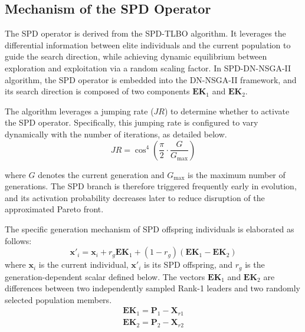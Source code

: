 \subsection{Mechanism of the SPD Operator}
The SPD operator is derived from the SPD-TLBO algorithm. It leverages the differential information between elite individuals and the current population to guide the search direction, while achieving dynamic equilibrium between exploration and exploitation via a random scaling factor. In SPD-DN-NSGA-II algorithm, the SPD operator is embedded into the DN-NSGA-II framework, and its search direction is composed of two components $\bm{EK}_1$ and $\bm{EK}_2$.
\par The algorithm leverages a jumping rate ($JR$) to determine whether to activate the SPD operator. Specifically, this jumping rate is configured to vary dynamically with the number of iterations, as detailed below. 
\begin{equation}
	JR=\cos^4 (\frac{\pi}{2}\cdot \frac{G}{G_{\text{max}}})
\end{equation}

where $G$ denotes the current generation and $G_{\text{max}}$ is the maximum number of generations. The SPD branch is therefore triggered frequently early in evolution, and its activation probability decreases later to reduce disruption of the approximated Pareto front.
\par The specific generation mechanism of SPD offspring individuals is elaborated as follows:
\begin{equation}
	\bm{x}'_i=\bm{x}_i+r_g\bm{EK}_1+(1-r_g)(\bm{EK}_1-\bm{EK}_2)
\end{equation}
where $\bm{x}_i$ is the current individual, $\bm{x}'_i$ is its SPD offspring, and $r_g$ is the generation-dependent scalar defined below. The vectors $\bm{EK}_1$ and $\bm{EK}_2$ are differences between two independently sampled Rank-1 leaders and two randomly selected population members.
\begin{equation}
	\begin{aligned}
		\bm{EK}_1=\bm{P}_1-\bm{X}_{r1} \\
		\bm{EK}_2=\bm{P}_2-\bm{X}_{r2}
	\end{aligned}
\end{equation}
